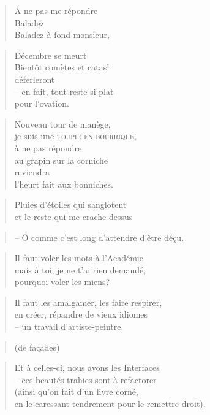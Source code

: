   \begin{verse}
    À ne pas me répondre\\
    Baladez\\
    Baladez à fond monsieur,
  \end{verse}
  \begin{verse}
    Décembre se meurt\\
    Bientôt comètes et catas’\\
    déferleront\\
    -- en fait, tout reste si plat\\
    pour l’ovation.
  \end{verse}
  \begin{verse}
    Nouveau tour de manège,\\
    je suis une \textsc{toupie en bourrique},\\
    à ne pas répondre\\
    au grapin sur la corniche\\
    reviendra\\
    l’heurt fait aux bonniches.
  \end{verse}
  \begin{verse}
    Pluies d’étoiles qui sanglotent\\
    et le reste qui me crache dessus
  \end{verse}
  \begin{verse}
    -- Ô comme c’est long d’attendre d’être déçu.
  \end{verse}
  \begin{verse}
    Il faut voler les mots à l’Académie\\
    mais à toi, je ne t’ai rien demandé,\\
    pourquoi voler les miens?
  \end{verse}
  \begin{verse}
    Il faut les amalgamer, les faire respirer,\\
    en créer, répandre de vieux idiomes\\
    -- un travail d’artiste-peintre.
  \end{verse}
  \begin{verse}
    (de façades)
  \end{verse}
  \begin{verse}
    Et à celles-ci, nous avons les Interfaces\\
    -- ces beautés trahies sont à refactorer\\
    (ainsi qu’on fait d’un livre corné,\\
    en le caressant tendrement pour le remettre droit).
  \end{verse}
